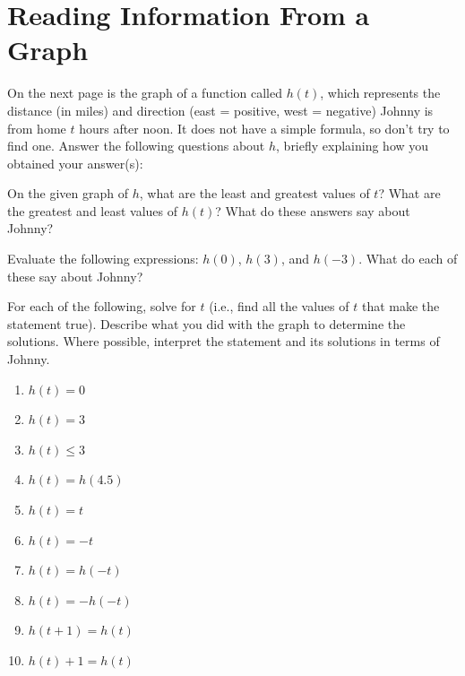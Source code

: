 \newpage
\section{Reading Information From a Graph}

On the next page is the graph of a function called $h(t)$, which
represents the distance (in miles) and direction (east = positive,
west = negative) Johnny is from home $t$ hours after noon. It does not
have a simple formula, so don't try to find one. Answer the following
questions about $h$, briefly explaining how you obtained your
answer(s):

\begin{prob}
On the given graph of $h$, what are the least and greatest values
of $t$? What are the greatest and least values of $h(t)$? What do
these answers say about Johnny?
\end{prob}

\begin{prob}
Evaluate the following expressions: $h(0)$, $h(3)$, and $h(-3)$. What
do each of these say about Johnny? 
\end{prob}

\begin{prob}
For each of the following, solve for $t$ (i.e., find all the values of
$t$ that make the statement true). Describe what you did with the
graph to determine the solutions.  Where possible, interpret
the statement and its solutions in terms of Johnny.

\begin{enumerate}
\item $h(t) = 0$
\item $h(t) = 3$
\item $h(t) \leq 3$
\item $h(t) = h(4.5)$
\item $h(t) = t$
\item $h(t) = -t$
\item $h(t) = h(-t)$
\item $h(t) = -h(-t)$
\item $h(t+1) = h(t)$
\item $h(t)+1 = h(t)$
\end{enumerate}
\end{prob}

\newpage

